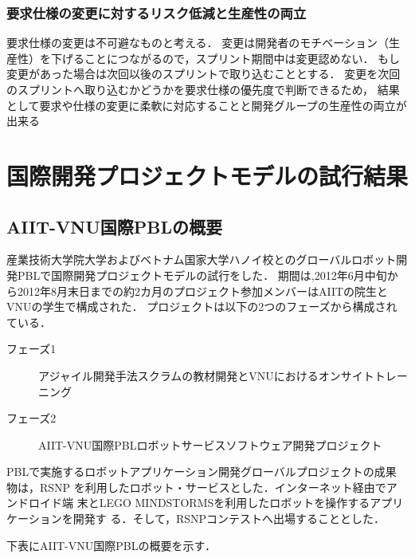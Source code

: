 \documentclass[a4j, 12Q, twocolumn, twoside]{jsarticle}
\begin{document}
\subsubsection{要求仕様の変更に対するリスク低減と生産性の両立}
要求仕様の変更は不可避なものと考える．
変更は開発者のモチベーション（生産性）を下げることにつながるので，スプリント期間中は変更認めない．
もし変更があった場合は次回以後のスプリントで取り込むこととする．
変更を次回のスプリントへ取り込むかどうかを要求仕様の優先度で判断できるため，
結果として要求や仕様の変更に柔軟に対応することと開発グループの生産性の両立が出来る


\section{国際開発プロジェクトモデルの試行結果}\label{sec:result}
\subsection{AIIT-VNU国際PBLの概要}
産業技術大学院大学およびベトナム国家大学ハノイ校とのグローバルロボット開発PBLで国際開発プロジェクトモデルの試行をした．
期間は,2012年6月中旬から2012年8月末日までの約2カ月のプロジェクト参加メンバーはAIITの院生とVNUの学生で構成された．
プロジェクトは以下の2つのフェーズから構成されている．

\begin{description}
\item[フェーズ1] アジャイル開発手法スクラムの教材開発とVNUにおけるオンサイトトレーニング
\item[フェーズ2] AIIT-VNU国際PBLロボットサービスソフトウェア開発プロジェクト
\end{description}

PBLで実施するロボットアプリケーション開発グローバルプロジェクトの成果
物は，RSNP
\cite{narita2011enhanced,kato2011rsi}
を利用したロボット・サービスとした．インターネット経由でアンドロイド端
末とLEGO MINDSTORMSを利用したロボットを操作するアプリケーションを開発す
る．そして，RSNPコンテストへ出場することとした．

下表にAIIT-VNU国際PBLの概要を示す．
\end{document}
